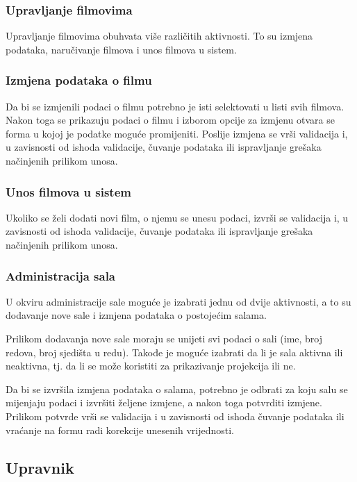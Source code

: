 \subsubsection{Upravljanje filmovima}
Upravljanje filmovima obuhvata više različitih aktivnosti. To su izmjena podataka, naručivanje filmova i unos filmova u sistem.

\subsubsection{Izmjena podataka o filmu}
Da bi se izmjenili podaci o filmu potrebno je isti selektovati u listi svih filmova. Nakon toga se prikazuju podaci o filmu i 
izborom opcije za izmjenu otvara se forma u kojoj je podatke moguće promijeniti. Poslije izmjena se vrši validacija i, u zavisnosti
 od ishoda validacije, čuvanje podataka ili ispravljanje grešaka načinjenih prilikom unosa. 
 




\subsubsection{Unos filmova u sistem}

Ukoliko se želi dodati novi film, o njemu se unesu podaci, izvrši se validacija i, u zavisnosti od ishoda validacije, čuvanje podataka
 ili ispravljanje grešaka načinjenih prilikom unosa.
 
\subsubsection{Administracija sala}
U okviru administracije sale moguće je izabrati jednu od dvije aktivnosti, a to su dodavanje nove sale i izmjena podataka o postojećim salama.


Prilikom dodavanja nove sale moraju se unijeti svi podaci o sali (ime, broj redova, broj sjedišta u redu). Takođe je moguće izabrati da li je sala aktivna ili neaktivna, tj. da li se može koristiti za prikazivanje projekcija ili ne.


Da bi se izvršila izmjena podataka o salama, potrebno je odbrati za koju salu se mijenjaju podaci i izvršiti željene izmjene, a nakon toga potvrditi izmjene. Prilikom potvrde  vrši se validacija i u zavisnosti od ishoda čuvanje podataka ili vraćanje na formu radi korekcije unesenih vrijednosti.

\subsection{Upravnik}
